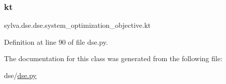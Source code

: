 \subsubsection{\texorpdfstring{kt}{kt}}
{\footnotesize\ttfamily sylva.\+dse.\+dse.\+system\+\_\+optimization\+\_\+objective.\+kt}



Definition at line 90 of file dse.\+py.



The documentation for this class was generated from the following file\+:\begin{DoxyCompactItemize}
\item 
dse/\hyperlink{dse_8py}{dse.\+py}\end{DoxyCompactItemize}
